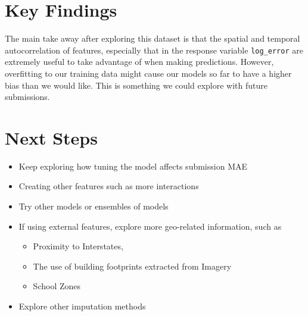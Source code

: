 \documentclass[]{book}
\providecommand{\tightlist}{%
  \setlength{\itemsep}{0pt}\setlength{\parskip}{0pt}}
\theoremstyle{definition}
\theoremstyle{definition}
\theoremstyle{definition}
\theoremstyle{remark}
\begin{document}
\section{Key Findings}\label{key-findings}

The main take away after exploring this dataset is that the spatial and
temporal autocorrelation of features, especially that in the response
variable \texttt{log\_error} are extremely useful to take advantage of
when making predictions. However, overfitting to our training data might
cause our models so far to have a higher bias than we would like. This
is something we could explore with future submissions.

\section{Next Steps}\label{next-steps}

\begin{itemize}
\tightlist
\item
  Keep exploring how tuning the model affects submission MAE
\item
  Creating other features such as more interactions
\item
  Try other models or ensembles of models
\item
  If using external features, explore more geo-related information, such
  as

  \begin{itemize}
  \tightlist
  \item
    Proximity to Interstates,
  \item
    The use of building footprints extracted from Imagery
  \item
    School Zones
  \end{itemize}
\item
  Explore other imputation methods
\end{itemize}


\end{document}
